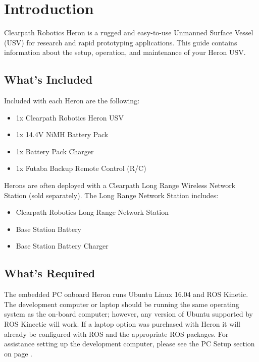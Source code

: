 \documentclass[]{clearpath-latex/clearpath-manual}
\begin{document}
\tableofcontents

\section{Introduction}
Clearpath Robotics Heron is a rugged and easy-to-use Unmanned Surface Vessel (USV) for research and rapid prototyping applications. This guide contains information about the setup, operation, and maintenance of your Heron USV.

\subsection{What's Included}

Included with each Heron are the following:

\begin{itemize}[nolistsep]
	\item 1x Clearpath Robotics Heron USV
	\item 1x 14.4V NiMH Battery Pack
	\item 1x Battery Pack Charger
	\item 1x Futaba Backup Remote Control (R/C)
\end{itemize}

Herons are often deployed with a Clearpath Long Range Wireless Network Station (sold separately). The Long Range Network Station includes:

\begin{itemize}[nolistsep]
	\item Clearpath Robotics Long Range Network Station
	\item Base Station Battery
	\item Base Station Battery Charger
\end{itemize}

\subsection{What's Required}

The embedded PC onboard Heron runs Ubuntu Linux 16.04 and ROS Kinetic. The development computer or laptop should be running the same operating system as the on-board computer; however, any version of Ubuntu supported by ROS Kinectic will work. If a laptop option was purchased with Heron it will already be configured with ROS and the appropriate ROS packages. For assistance setting up the development computer, please see the PC Setup section on page \pageref{pcsetup}.
\end{document}
